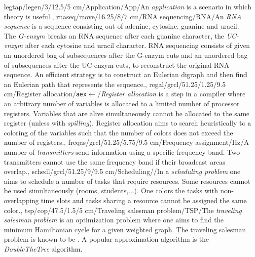legtap/legen/3/12.5/5 cm/Application/App/{An \emph{application} is a scenario in which theory is useful.},
rnaseq/move/16.25/8/7 cm/{RNA sequencing}/{RNA}/{An \emph{RNA sequence} is a sequence consisting out of adenine, cytosine, guanine and uracil. The \emph{G-enzym} breaks an RNA sequence after each guanine character, the \emph{UC-enzym} after each cytosine and uracil character. RNA sequencing consists of given an unordered bag of subsequences after the G-enzym cuts and an unordered bag of subsequences after the UC-enzym cuts, to reconstruct the original RNA sequence. An efficient strategy is to construct an Eulerian digraph and then find an Eulerian path that represents the sequence.},
regal/grcl/51.25/1.25/9.5 cm/{Register allocation}/{\texttt{aex}$\gets$}/{\emph{Register allocation} is a step in a compiler where an arbitrary number of variables is allocated to a limited number of processor registers. Variables that are alive simultaneously cannot be allocated to the same register (unless with \emph{spilling}). Register allocation aims to search heuristically to a coloring of the variables such that the number of colors does not exceed the number of registers.},
freqas/grcl/51.25/5.75/9.5 cm/{Frequency assignment}/{Hz}/{A number of \emph{transmitters} send information using a specific frequency band. Two transmitters cannot use the same frequency band if their broadcast areas overlap.},
schedl/grcl/51.25/9/9.5 cm/{Scheduling}/{\clock}/{In a \emph{scheduling problem} one aims to schedule a number of tasks that require resources. Some resources cannot be used simultaneously (rooms, students,...). One colors the tasks with non-overlapping time slots and tasks sharing a resource cannot be assigned the same color.},
tsp/cop/47.5/1.5/5 cm/{Traveling salesman problem}/{TSP}/{The \emph{traveling salesman problem} is an optimization problem where one aims to find the minimum Hamiltonian cycle for a given weighted graph. The traveling salesman problem is known to be \ccnph{}. A popular approximation algorithm is the \emph{DoubleTheTree} algorithm.}